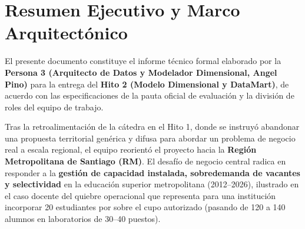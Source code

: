 \documentclass[11pt,a4paper]{article}
\begin{document}
\tableofcontents
\newpage

\section{Resumen Ejecutivo y Marco Arquitectónico}
\label{sec:resumen}

El presente documento constituye el informe técnico formal elaborado por la \textbf{Persona 3 (Arquitecto de Datos y Modelador Dimensional, Angel Pino)} para la entrega del \textbf{Hito 2 (Modelo Dimensional y DataMart)}, de acuerdo con las especificaciones de la pauta oficial de evaluación y la división de roles del equipo de trabajo.

Tras la retroalimentación de la cátedra en el Hito 1, donde se instruyó abandonar una propuesta territorial genérica y difusa para abordar un problema de negocio real a escala regional, el equipo reorientó el proyecto hacia la \textbf{Región Metropolitana de Santiago (RM)}. El desafío de negocio central radica en responder a la \textbf{gestión de capacidad instalada, sobredemanda de vacantes y selectividad} en la educación superior metropolitana (2012--2026), ilustrado en el caso docente del quiebre operacional que representa para una institución incorporar 20 estudiantes por sobre el cupo autorizado (pasando de 120 a 140 alumnos en laboratorios de 30--40 puestos).
\end{document}
